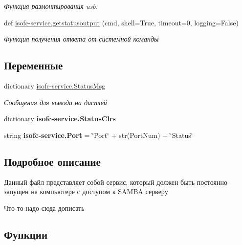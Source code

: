 \begin{DoxyCompactItemize}
\begin{DoxyCompactList}\small\item\em Функция размонтирования usb. \end{DoxyCompactList}\item 
def \mbox{\hyperlink{isofc-service_8py_a7d6f596c01260b208bc72a0c7722337f}{isofc-\/service.\+getstatusoutput}} (cmd, shell=True, timeout=0, logging=False)
\begin{DoxyCompactList}\small\item\em Функция получения ответа от системной команды \end{DoxyCompactList}\end{DoxyCompactItemize}
\subsection*{Переменные}
\begin{DoxyCompactItemize}
\item 
dictionary \mbox{\hyperlink{isofc-service_8py_a86c2854b086f3034ce6820a9db41f34b}{isofc-\/service.\+Status\+Msg}}
\begin{DoxyCompactList}\small\item\em Сообщения для вывода на дисплей \end{DoxyCompactList}\item 
dictionary {\bfseries isofc-\/service.\+Status\+Clrs}
\item 
\mbox{\label{isofc-service_8py_a1a05ad08514211f9ef48bee10308ea73}} 
string {\bfseries isofc-\/service.\+Port} = \char`\"{}Port\char`\"{} + str(Port\+Num) + \char`\"{}Status\char`\"{}
\end{DoxyCompactItemize}


\subsection{Подробное описание}
Данный файл представляет собой сервис, который должен быть постоянно запущен на компьютере с доступом к S\+A\+M\+BA серверу 

Что-\/то надо сюда дописать 

\subsection{Функции}
\mbox{\label{isofc-service_8py_file_a3a76537b729e2a715e4c0c781f59f322}} 
